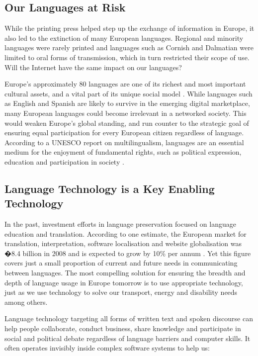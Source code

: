 \documentclass[]{../../metanetpaper}
\begin{document}
\begin{multicols}{2}
\subsection{Our Languages at Risk}

While the printing press helped step up the exchange of information in Europe, it also led to the extinction of many European languages. Regional and minority languages were rarely printed and languages such as Cornish and Dalmatian were limited to oral forms of transmission, which in turn restricted their scope of use. Will the Internet have the same impact on our languages?


Europe's approximately 80 languages are one of its richest and most important
cultural assets, and a vital part of its unique social model \cite{EC2}. While
languages such as English and Spanish are likely to survive in the emerging
digital marketplace, many European languages could become irrelevant in a
networked society. This would weaken Europe's global standing, and run counter
to the strategic goal of ensuring equal participation for every European
citizen regardless of language. According to a UNESCO report on
multilingualism, languages are an essential medium for the enjoyment of
fundamental rights, such as political expression, education and participation
in society \cite{Unesco1}.

\subsection{Language Technology is a Key Enabling Technology}

In the past, investment efforts in language preservation focused on language
education and translation. According to one estimate, the European market for
translation, interpretation, software localisation and website globalisation
was �8.4 billion in 2008 and is expected to grow by 10\% per annum
\cite{EC3}. Yet this figure covers just a small proportion of current and
future needs in communicating between languages. The most compelling solution
for ensuring the breadth and depth of language usage in Europe tomorrow is to
use appropriate technology, just as we use technology to solve our transport,
energy and disability needs among others.

Language technology targeting all forms of written text and spoken
discourse can help people collaborate, conduct business, share knowledge and
participate in social and political debate regardless of language barriers and
computer skills. It often operates invisibly inside complex software systems
to help us:


\end{multicols}
\end{document}
